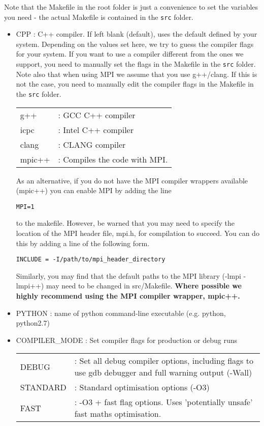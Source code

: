 \documentclass[a4paper]{article}
\newcommand{\var}[1]{\texttt{#1}}
\begin{document}
Note that the Makefile in the root folder is just a convenience to set the variables you need - the actual Makefile is contained in the \var{src} folder.

\begin{itemize}

\item CPP : C++ compiler. If left blank (default), uses the default defined by your system. Depending on the values set here, we try to guess the compiler flags for your system. If you want to use a compiler different from the ones we support, you need to manually set the flags in the Makefile in the \var{src} folder. Note also that when using MPI we assume that you use g++/clang. If this is not the case, you need to manually edit the compiler flags in the Makefile in the \var{src} folder.\\
\begin{tabular}{ll}
g++ & : GCC C++ compiler \\
icpc & : Intel C++ compiler \\
clang & : CLANG compiler\\
mpic++ & : Compiles the code with MPI. \\
\end{tabular}

As an alternative, if you do not have the MPI compiler wrappers available (mpic++) you can enable MPI by adding the line
\begin{lstlisting}
MPI=1
\end{lstlisting}
to the makefile. However, be warned that you may need to specify the location of the MPI header file, mpi.h, for compilation to succeed. You can do this by adding a line of the following form.
\begin{lstlisting}
INCLUDE = -I/path/to/mpi_header_directory
\end{lstlisting}
Similarly, you may find that the default paths to the MPI library (-lmpi -lmpi++) may need to be changed in src/Makefile. \textbf{Where possible we highly recommend using the MPI compiler wrapper, mpic++.}


\item PYTHON : name of python command-line executable (e.g. python, python2.7)

\item COMPILER\_MODE : Set compiler flags for production or debug runs \\
\begin{tabular}{ll}
DEBUG & : Set all debug compiler options, including flags to use gdb debugger and full warning output (-Wall) \\
STANDARD & : Standard optimisation options (-O3) \\
FAST & : -O3 + fast flag options.  Uses 'potentially unsafe' fast maths optimisation.
\end{tabular}


\end{itemize}
\end{document}
